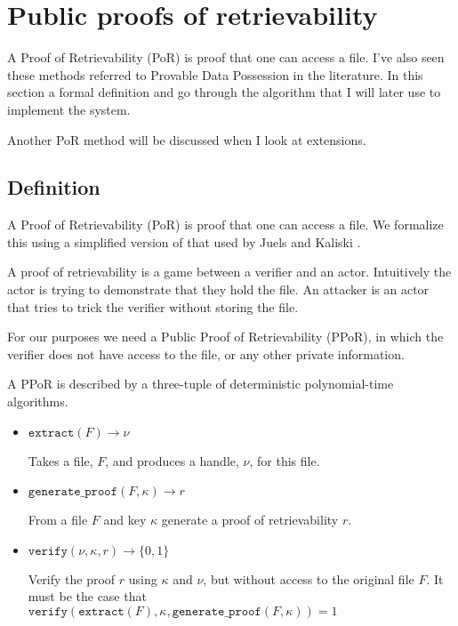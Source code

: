 \documentclass[12pt,a4paper,twoside,openright]{report}
\begin{document}
\section{Public proofs of retrievability}

A Proof of Retrievability (PoR) is proof that one can access a file.
I've also seen these methods referred to Provable Data Possession in the literature.
In this section a formal definition and go through the algorithm that I will
later use to implement the system.

Another PoR method will be discussed when I look at extensions.

\subsection{Definition}
A Proof of Retrievability (PoR) is proof that one can access a file.
We formalize this using a simplified version of that used by Juels and Kaliski \cite{ecc-por}.

A proof of retrievability is a game between a verifier and an actor.
Intuitively the actor is trying to demonstrate that they hold the file.
An attacker is an actor that tries to trick the verifier without storing the file.




%
%
%



For our purposes we need a Public Proof of Retrievability (PPoR), in which the verifier does not have access to the file,
or any other private information.

A PPoR is described by a three-tuple of deterministic polynomial-time algorithms.

\begin{itemize}
\item $\texttt{extract}(F) \to \nu$

Takes a file, $F$, and produces a handle, $\nu$, for this file.


\item $\texttt{generate\_proof}(F, \kappa) \to r$

From a file $F$ and key $\kappa$ generate a proof of retrievability $r$.

\item $\texttt{verify}(\nu, \kappa, r) \to \{0, 1\}$

Verify the proof $r$ using $\kappa$ and $\nu$, but without access to the original file $F$.
It must be the case that $\texttt{verify}(\texttt{extract}(F), \kappa, \texttt{generate\_proof}(F, \kappa)) = 1$
\end{itemize}
\end{document}

